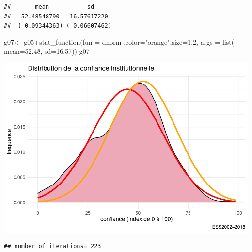 \documentclass[
]{book}
\newenvironment{Shaded}{\begin{snugshade}}{\end{snugshade}}
\newcommand{\AttributeTok}[1]{\textcolor[rgb]{0.77,0.63,0.00}{#1}}
\newcommand{\DecValTok}[1]{\textcolor[rgb]{0.00,0.00,0.81}{#1}}
\newcommand{\FloatTok}[1]{\textcolor[rgb]{0.00,0.00,0.81}{#1}}
\newcommand{\FunctionTok}[1]{\textcolor[rgb]{0.00,0.00,0.00}{#1}}
\newcommand{\NormalTok}[1]{#1}
\newcommand{\OtherTok}[1]{\textcolor[rgb]{0.56,0.35,0.01}{#1}}
\newcommand{\SpecialCharTok}[1]{\textcolor[rgb]{0.00,0.00,0.00}{#1}}
\newcommand{\StringTok}[1]{\textcolor[rgb]{0.31,0.60,0.02}{#1}}
\begin{document}
\begin{verbatim}
##       mean           sd     
##   52.48548790   16.57617220 
##  ( 0.09344363) ( 0.06607462)
\end{verbatim}

\begin{Shaded}
\begin{Highlighting}[]
\NormalTok{g07}\OtherTok{\textless{}{-}}\NormalTok{ g05}\SpecialCharTok{+}\FunctionTok{stat\_function}\NormalTok{(}\AttributeTok{fun =}\NormalTok{  dnorm ,}\AttributeTok{color=}\StringTok{"orange"}\NormalTok{,}\AttributeTok{size=}\FloatTok{1.2}\NormalTok{, }\AttributeTok{args =} \FunctionTok{list}\NormalTok{( }\AttributeTok{mean=}\FloatTok{52.48}\NormalTok{,  }\AttributeTok{sd=}\FloatTok{16.57}\NormalTok{))}
\NormalTok{g07}
\end{Highlighting}
\end{Shaded}

\includegraphics{bookdown-demo_files/figure-latex/307-1.pdf}

\begin{Shaded}
\end{Shaded}

\begin{verbatim}
## number of iterations= 223
\end{verbatim}
\end{document}
